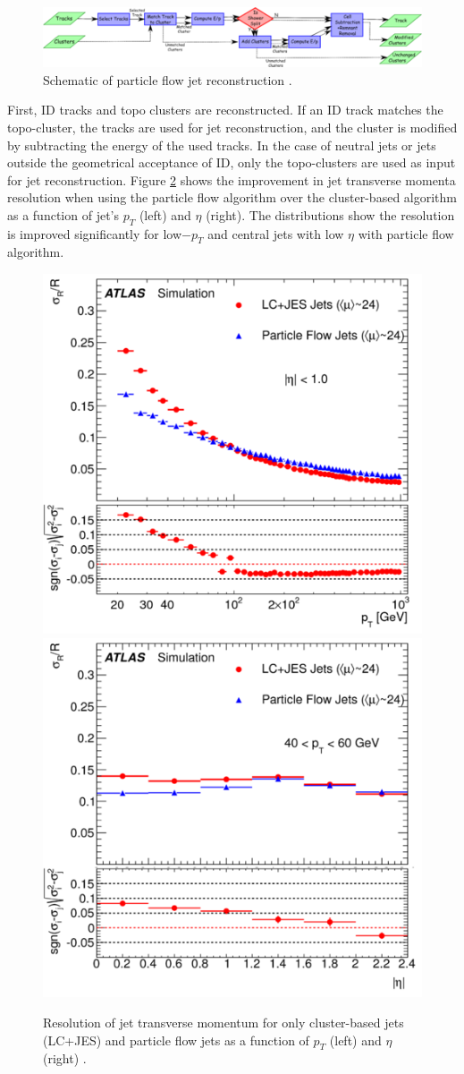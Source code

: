 \begin{figure}
    \centering
    \includegraphics[width=.95\linewidth]{figures/LHC/PflowAlg.pdf}
    \caption{ Schematic of particle flow jet reconstruction \cite{ParticleFlow}.\label{fig:PflowJets}}
\end{figure}

First, ID tracks and topo clusters are reconstructed. If an ID track matches the topo-cluster, the tracks are used for jet reconstruction, and the cluster is modified by subtracting the energy of the used tracks. In the case of neutral jets or jets outside the geometrical acceptance of ID, only the topo-clusters are used as input for jet reconstruction. Figure \ref{fig:PflowvsCalo} shows the improvement in jet transverse momenta resolution when using the particle flow algorithm over the cluster-based algorithm as a function of jet's $p_{T}$ (left) and $\eta$ (right). The distributions show the resolution is improved significantly for low$-p_{T}$ and central jets with low $\eta$ with particle flow algorithm.

\begin{figure}
    \centering
    \includegraphics[width=.48\linewidth]{figures/LHC/Pflow_vs_Calo_pt.pdf}
    \includegraphics[width=.48\linewidth]{figures/LHC/Pflow_vs_Calo_eta.pdf}
    \caption{ Resolution of jet transverse momentum for only cluster-based jets (LC+JES) and particle flow jets as a function of $p_{T}$ (left) and $\eta$ (right) \cite{ParticleFlow}.\label{fig:PflowvsCalo}}
\end{figure}

